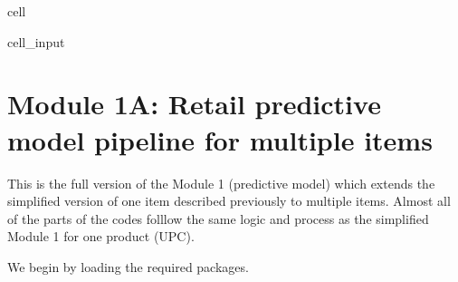 \documentclass[letterpaper,10pt,english]{jupyterBook}
\begin{document}
\begin{sphinxuseclass}{cell}\begin{sphinxVerbatimInput}

\begin{sphinxuseclass}{cell_input}
\begin{sphinxVerbatim}[commandchars=\\\{\}]
 

  
  
\end{sphinxVerbatim}

\end{sphinxuseclass}\end{sphinxVerbatimInput}

\end{sphinxuseclass}
\sphinxstepscope


\section{Module 1A: Retail predictive model pipeline for multiple items}
\label{\detokenize{docs/Case1_2_Module1A_Retail_Demand_Model:module-1a-retail-predictive-model-pipeline-for-multiple-items}}\label{\detokenize{docs/Case1_2_Module1A_Retail_Demand_Model::doc}}
\sphinxAtStartPar
{}

\sphinxAtStartPar
This is the full version of the Module 1 (predictive model) which extends the simplified version of one item described previously to multiple items. Almost all of the parts of the codes folllow the same logic and process as the simplified Module 1 for one product (UPC).

\sphinxAtStartPar
We begin by loading the required packages.
\end{document}
